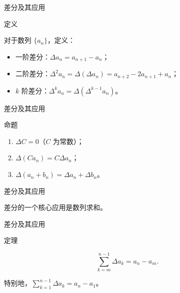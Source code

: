 \documentclass[aspectratio=169,10pt,fontset=fandol]{ctexbeamer}
\begin{document}
\begin{frame}[t,fragile]{差分及其应用}
\normalsize
\begin{block}{定义}
{\normalsize


对于数列 \(\{a_n\}\)，定义：

\begin{itemize}

\item 一阶差分：\(\Delta a_n = a_{n+1} - a_n\)；

\item 二阶差分：\(\Delta^2 a_n = \Delta(\Delta a_n) = a_{n+2} - 2a_{n+1} + a_n\)；

\item \(k\) 阶差分：\(\Delta^k a_n = \Delta(\Delta^{k-1} a_n)\)。

\end{itemize}


}
\end{block}
\end{frame}
\begin{frame}[t,fragile]{差分及其应用}
\normalsize
\begin{block}{命题}
{\normalsize


\begin{enumerate}

\item \(\Delta C = 0\)（\(C\) 为常数）；

\item \(\Delta(C a_n) = C \Delta a_n\)；

\item \(\Delta(a_n + b_n) = \Delta a_n + \Delta b_n\)。

\end{enumerate}


}
\end{block}
\end{frame}
\begin{frame}[t,fragile]{差分及其应用}
\normalsize
{\normalsize




差分的一个核心应用是数列求和。




}
\end{frame}
\begin{frame}[t,fragile]{差分及其应用}
\normalsize
\begin{block}{定理}
{\normalsize


\[

\sum _{k=m}^{n-1} \Delta a_k = a_n - a_m.

\]

特别地，\(\sum_{k=1}^{n-1} \Delta a_k = a_n - a_1\)。


}
\end{block}
\end{frame}
\end{document}
